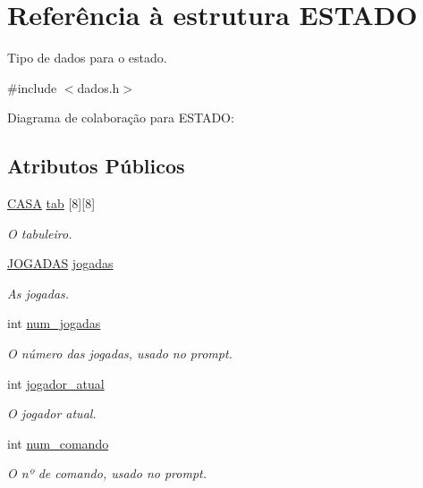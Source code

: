 \hypertarget{structESTADO}{}\section{Referência à estrutura E\+S\+T\+A\+DO}
\label{structESTADO}


Tipo de dados para o estado.  




{\ttfamily \#include $<$dados.\+h$>$}



Diagrama de colaboração para E\+S\+T\+A\+DO\+:
\subsection*{Atributos Públicos}
\begin{DoxyCompactItemize}
\item 
\hyperlink{dados_8h_aba91601f16d4c485b2d9b8c429f27039}{C\+A\+SA} \hyperlink{structESTADO_ab56f0f1be16954d3768b4174d14c087d}{tab} \mbox{[}8\mbox{]}\mbox{[}8\mbox{]}
\begin{DoxyCompactList}\small\item\em O tabuleiro. \end{DoxyCompactList}\item 
\hyperlink{dados_8h_a94c221d29a1760f008b7834093259b7d}{J\+O\+G\+A\+D\+AS} \hyperlink{structESTADO_afae43b87a488fad0f2b56a18bad31d18}{jogadas}
\begin{DoxyCompactList}\small\item\em As jogadas. \end{DoxyCompactList}\item 
int \hyperlink{structESTADO_a261495728744647e618b4e623f5a4b7a}{num\+\_\+jogadas}
\begin{DoxyCompactList}\small\item\em O número das jogadas, usado no prompt. \end{DoxyCompactList}\item 
int \hyperlink{structESTADO_a5dd28e2e68b7aef2b6b7ea88e02eff58}{jogador\+\_\+atual}
\begin{DoxyCompactList}\small\item\em O jogador atual. \end{DoxyCompactList}\item 
int \hyperlink{structESTADO_adf1064dfc09145b6995a7897249f1674}{num\+\_\+comando}
\begin{DoxyCompactList}\small\item\em O nº de comando, usado no prompt. \end{DoxyCompactList}\item 

\end{DoxyCompactItemize}
